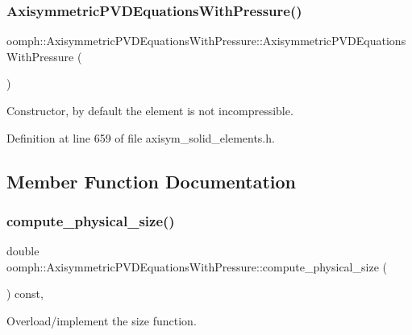 \subsubsection{\texorpdfstring{Axisymmetric\+P\+V\+D\+Equations\+With\+Pressure()}{AxisymmetricPVDEquationsWithPressure()}}
{\footnotesize\ttfamily oomph\+::\+Axisymmetric\+P\+V\+D\+Equations\+With\+Pressure\+::\+Axisymmetric\+P\+V\+D\+Equations\+With\+Pressure (\begin{DoxyParamCaption}{ }\end{DoxyParamCaption})\hspace{0.3cm}{\ttfamily [inline]}}



Constructor, by default the element is not incompressible. 



Definition at line 659 of file axisym\+\_\+solid\+\_\+elements.\+h.



\subsection{Member Function Documentation}
\mbox{\label{classoomph_1_1AxisymmetricPVDEquationsWithPressure_a975e38ffef201b3c8bd36e7ff6206eb9}} 
\subsubsection{\texorpdfstring{compute\+\_\+physical\+\_\+size()}{compute\_physical\_size()}}
{\footnotesize\ttfamily double oomph\+::\+Axisymmetric\+P\+V\+D\+Equations\+With\+Pressure\+::compute\+\_\+physical\+\_\+size (\begin{DoxyParamCaption}{ }\end{DoxyParamCaption}) const\hspace{0.3cm}{\ttfamily [inline]}, {\ttfamily [virtual]}}



Overload/implement the size function. 



